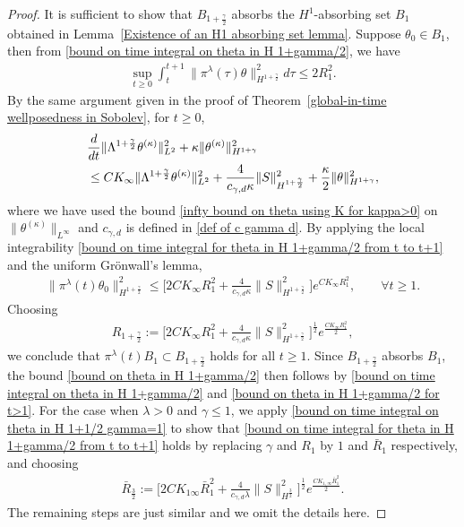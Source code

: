 \documentclass[reqno]{amsart}%
\theoremstyle{definition}
\theoremstyle{remark}
\numberwithin{equation}{section}
\newcommand{\thetakappa}{\theta^{(\kappa)}}
\newcommand{\1}{\mathbf{1}}
\newcommand{\K}{K_{\infty}}
\newcommand{\pin}{\pi^{\lambda}}
\numberwithin{equation}{section}
\numberwithin{theorem}{section}
\numberwithin{figure}{section}
\begin{document}
\begin{proof}
It is sufficient to show that $B_{1+\frac{\gamma}{2}}$ absorbs the $H^1$-absorbing set $B_1$ obtained in Lemma~\ref{Existence of an H1 absorbing set lemma}. Suppose $\theta_0\in B_{1}$, then from \eqref{bound on time integral on theta in H 1+gamma/2}, we have
\begin{align}\label{bound on time integral for theta in H 1+gamma/2 from t to t+1}
\sup_{t\ge0}\int_{t}^{t+1}\|\pin(\tau)\theta\|^2_{H^{1+\frac{\gamma}{2}}}d\tau\le 2R_1^2.
\end{align}
By the same argument given in the proof of Theorem~\ref{global-in-time wellposedness in Sobolev}, for $t\ge0$, 
\begin{align}\label{differential inequality on theta 1+gamma}
&\frac{d}{dt}\|\Lambda^{1+\frac{\gamma}{2}}\thetakappa\|^2_{L^2}+\kappa\|\thetakappa\|^2_{H^{1+\gamma}}\notag\\
&\le C\K\|\Lambda^{1+\frac{\gamma}{2}}\thetakappa\|^2_{L^2}+\frac{4}{c_{\gamma,d}\kappa}\|S\|^2_{H^{1+\frac{\gamma}{2}}}+\frac{\kappa}{2}\|\theta\|^2_{H^{1+\gamma}},
\end{align}
where we have used the bound \eqref{infty bound on theta using K for kappa>0} on $\|\thetakappa\|_{L^\infty}$ and $c_{\gamma,d}$ is defined in \eqref{def of c gamma d}. By applying the local integrability \eqref{bound on time integral for theta in H 1+gamma/2 from t to t+1} and the uniform Gr\"{o}nwall's lemma,
\begin{align}\label{bound on theta in H 1+gamma/2 for t>1}
\|\pin(t)\theta_0\|^2_{H^{1+\frac{\gamma}{2}}}\le\Big[2C\K R_1^2+\frac{4}{c_{\gamma,d}\kappa}\|S\|^2_{H^{1+\frac{\gamma}{2}}}\Big]e^{C\K R_1^2},\qquad \forall t\ge1.
\end{align}
Choosing 
\begin{align*}
R_{1+\frac{\gamma}{2}}:=\Big[2C\K R_1^2+\frac{4}{c_{\gamma,d}\kappa}\|S\|^2_{H^{1+\frac{\gamma}{2}}}\Big]^\frac{1}{2}e^{\frac{C\K R_1^2}{2}},
\end{align*}
we conclude that $\pin(t) B_1\subset B_{1+\frac{\gamma}{2}}$ holds for all $t\ge1$. Since $B_{1+\frac{\gamma}{2}}$ absorbs $B_1$, the bound \eqref{bound on theta in H 1+gamma/2} then follows  by \eqref{bound on time integral on theta in H 1+gamma/2} and \eqref{bound on theta in H 1+gamma/2 for t>1}. For the case when $\lambda>0$ and $\gamma\le1$, we apply \eqref{bound on time integral on theta in H 1+1/2 gamma=1} to show that \eqref{bound on time integral for theta in H 1+gamma/2 from t to t+1} holds by replacing $\gamma$ and $R_1$ by $1$ and $\bar{R}_1$ respectively, and choosing
\begin{align*}
\bar{R}_{\frac{3}{2}}:=\Big[2CK_{1\infty} \bar{R}_1^2+\frac{4}{c_{\gamma,d}\lambda}\|S\|^2_{H^{\frac{3}{2}}}\Big]^\frac{1}{2}e^{\frac{CK_{1,\infty} \bar{R}_1^2}{2}}.
\end{align*}
The remaining steps are just similar and we omit the details here.
\end{proof}
\end{document}

